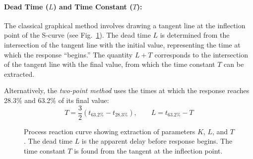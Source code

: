\paragraph{Dead Time ($L$) and Time Constant ($T$):}
The classical graphical method involves drawing a tangent line at the inflection point of the S-curve (see Fig.~\ref{fig:process_reaction_curve}). The dead time $L$ is determined from the intersection of the tangent line with the initial value, representing the time at which the response ``begins.'' The quantity $L + T$ corresponds to the intersection of the tangent line with the final value, from which the time constant $T$ can be extracted.

Alternatively, the \textit{two-point method} uses the times at which the response reaches 28.3\% and 63.2\% of its final value:
\begin{equation}
    T = \frac{3}{2}\left(t_{63.2\%} - t_{28.3\%}\right), \qquad L = t_{63.2\%} - T
\end{equation}

\begin{figure}[htbp]
\centering
{}
\caption{Process reaction curve showing extraction of parameters $K$, $L$, and $T$. The dead time $L$ is the apparent delay before response begins. The time constant $T$ is found from the tangent at the inflection point.}
\label{fig:process_reaction_curve}
\end{figure}

